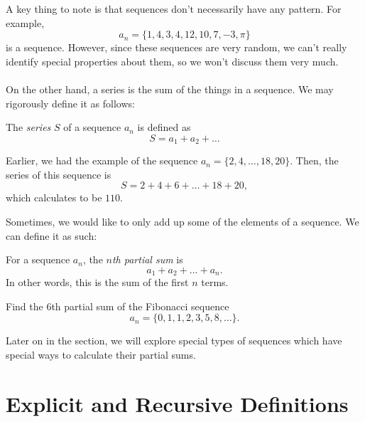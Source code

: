 A key thing to note is that sequences don't necessarily have any pattern. For example,
\[a_n=\{1,4,3,4,12,10,7,-3,\pi\}\] 
is a sequence. However, since these sequences are very random, we can't really identify special properties about them, so we won't discuss them very much.
\\\\
On the other hand, a series is the sum of the things in a sequence. We may rigorously define it as follows:
\begin{definition}
    The \emph{series} $S$ of a sequence $a_n$ is defined as
    \[S=a_1+a_2+\dots\]
\end{definition}
\begin{example}
    Earlier, we had the example of the sequence $a_n=\{2,4,\dots,18,20\}$. Then, the series of this sequence is
    \[S=2+4+6+\dots+18+20,\]
    which calculates to be $110$.
\end{example}
Sometimes, we would like to only add up some of the elements of a sequence. We can define it as such:
\begin{definition}
    For a sequence $a_n$, the \emph{$n$th partial sum} is
    \[a_1+a_2+\dots+a_n.\]
    In other words, this is the sum of the first $n$ terms.
\end{definition}
\begin{exercise}
    Find the $6$th partial sum of the Fibonacci sequence
    \[a_n=\{0,1,1,2,3,5,8,\dots\}.\]
\end{exercise}
Later on in the section, we will explore special types of sequences which have special ways to calculate their partial sums.

\section{Explicit and Recursive Definitions}

